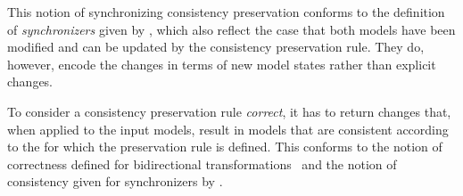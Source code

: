 This notion of synchronizing consistency preservation conforms to the definition of \emph{synchronizers} given by \textcite{xiong2013SynchronizingConcurrentUpdates-SoSym}, which also reflect the case that both models have been modified and can be updated by the consistency preservation rule.
They do, however, encode the changes in terms of new model states rather than explicit changes.

To consider a consistency preservation rule \emph{correct}, it has to return changes that, when applied to the input models, result in models that are consistent according to the \modellevelconsistencyrelation for which the preservation rule is defined.
This conforms to the notion of correctness defined for bidirectional transformations~\cite{stevens2010sosym} and the notion of consistency given for synchronizers by \textcite{xiong2013SynchronizingConcurrentUpdates-SoSym}.


